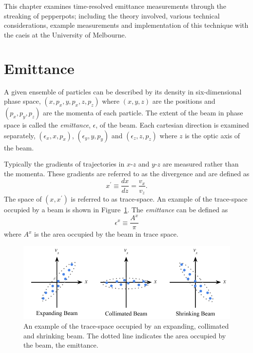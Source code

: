 This chapter examines time-resolved emittance measurements through the streaking of pepperpots; including the theory involved, various technical considerations, example measurements and implementation of this technique with the \gls{caeis} at the University of Melbourne.


\section{Emittance}

A given ensemble of particles can be described by its density in six-dimensional phase space, $(x, p_x, y, p_x, z, p_z)$ where $(x, y, z)$ are the positions and $(p_x, p_y, p_z)$ are the momenta of each particle.
The extent of the beam in phase space is called the \emph{emittance}, $\epsilon$, of the beam.
Each cartesian direction is examined separately, $(\epsilon_x, x, p_x)$, $(\epsilon_y, y, p_y)$ and $(\epsilon_z, z, p_z)$ where $z$ is the optic axis of the beam.

Typically the gradients of trajectories in $x$-$z$ and $y$-$z$ are measured rather than the momenta.
These gradients are referred to as the divergence and are defined as
\begin{equation}\label{equation:divergence}
x^\prime \equiv \frac{dx}{dz} = \frac{v_x}{v_z}.
\end{equation}
The space of $(x, x^\prime)$ is referred to as trace-space.
An example of the trace-space occupied by a beam is shown in Figure~\ref{figure:emittance_example}.
The \emph{emittance} can be defined as
\begin{equation}
\epsilon^x \equiv \frac{A^x}{\pi}
\end{equation}
where $A^x$ is the area occupied by the beam in trace space.

\begin{figure}
\center
\includegraphics{part2/Figs/EmittanceExample.pdf}
\caption{An example of the trace-space occupied by an expanding, collimated and shrinking beam. The dotted line indicates the area occupied by the beam, the emittance.}
\label{figure:emittance_example}
\end{figure}

